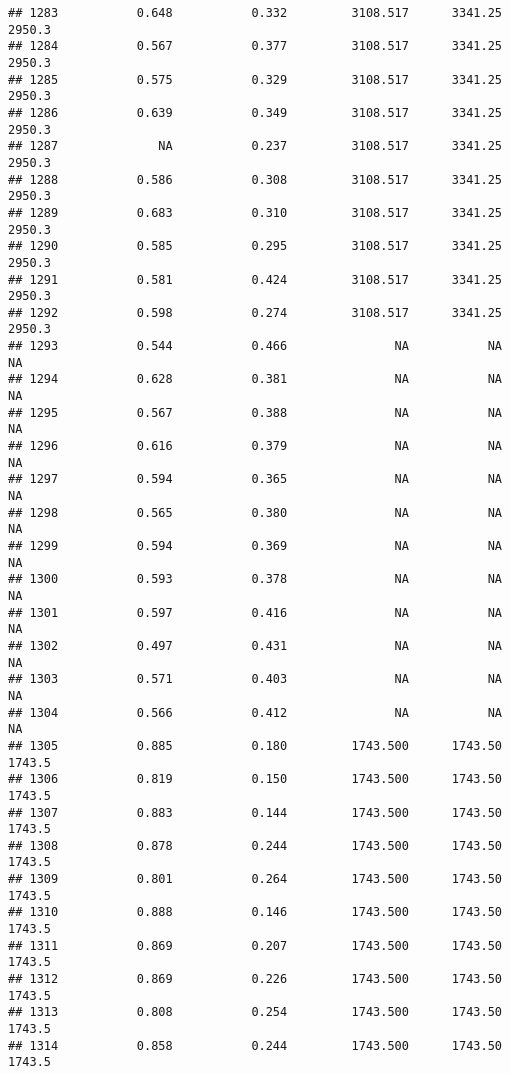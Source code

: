 \documentclass[
]{article}
\begin{document}
\begin{verbatim}
## 1283           0.648           0.332         3108.517      3341.25       2950.3
## 1284           0.567           0.377         3108.517      3341.25       2950.3
## 1285           0.575           0.329         3108.517      3341.25       2950.3
## 1286           0.639           0.349         3108.517      3341.25       2950.3
## 1287              NA           0.237         3108.517      3341.25       2950.3
## 1288           0.586           0.308         3108.517      3341.25       2950.3
## 1289           0.683           0.310         3108.517      3341.25       2950.3
## 1290           0.585           0.295         3108.517      3341.25       2950.3
## 1291           0.581           0.424         3108.517      3341.25       2950.3
## 1292           0.598           0.274         3108.517      3341.25       2950.3
## 1293           0.544           0.466               NA           NA           NA
## 1294           0.628           0.381               NA           NA           NA
## 1295           0.567           0.388               NA           NA           NA
## 1296           0.616           0.379               NA           NA           NA
## 1297           0.594           0.365               NA           NA           NA
## 1298           0.565           0.380               NA           NA           NA
## 1299           0.594           0.369               NA           NA           NA
## 1300           0.593           0.378               NA           NA           NA
## 1301           0.597           0.416               NA           NA           NA
## 1302           0.497           0.431               NA           NA           NA
## 1303           0.571           0.403               NA           NA           NA
## 1304           0.566           0.412               NA           NA           NA
## 1305           0.885           0.180         1743.500      1743.50       1743.5
## 1306           0.819           0.150         1743.500      1743.50       1743.5
## 1307           0.883           0.144         1743.500      1743.50       1743.5
## 1308           0.878           0.244         1743.500      1743.50       1743.5
## 1309           0.801           0.264         1743.500      1743.50       1743.5
## 1310           0.888           0.146         1743.500      1743.50       1743.5
## 1311           0.869           0.207         1743.500      1743.50       1743.5
## 1312           0.869           0.226         1743.500      1743.50       1743.5
## 1313           0.808           0.254         1743.500      1743.50       1743.5
## 1314           0.858           0.244         1743.500      1743.50       1743.5

\end{verbatim}
\end{document}
